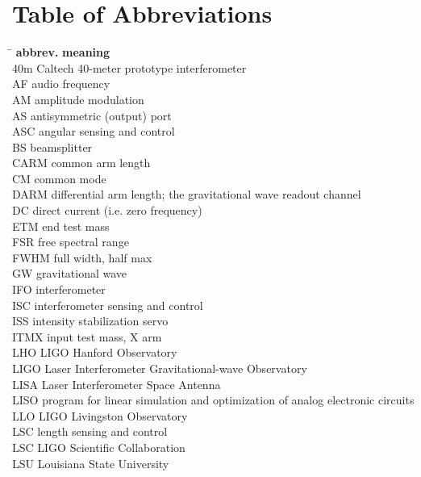 \chapter{Table of Abbreviations}
\label{chapter6}
\singlespacing
\vspace{-20pt}
\begin{tabbing}
\hspace{1in} \= \hspace{5in} \kill
\textbf{abbrev.} \> \textbf{meaning} \\
40m  \> Caltech 40-meter prototype interferometer \\
AF   \> audio frequency \\
AM   \> amplitude modulation \\
AS   \> antisymmetric (output) port \\
ASC  \> angular sensing and control \\
BS   \> beamsplitter \\
CARM \> common arm length \\
CM   \> common mode \\
DARM \> differential arm length; the gravitational wave readout channel \\
DC   \> direct current (i.e. zero frequency) \\
ETM  \> end test mass \\
FSR  \> free spectral range \\
FWHM \> full width, half max \\
GW   \> gravitational wave \\
IFO  \> interferometer \\
ISC  \> interferometer sensing and control \\
ISS  \> intensity stabilization servo \\
ITMX \> input test mass, X arm \\
LHO  \> LIGO Hanford Observatory \\
LIGO \> Laser Interferometer Gravitational-wave Observatory \\
LISA \> Laser Interferometer Space Antenna \\
LISO \> program for linear simulation and optimization of analog electronic circuits \\
LLO  \> LIGO Livingston Observatory \\
LSC  \> length sensing and control \\
LSC  \> LIGO Scientific Collaboration \\
LSU  \> Louisiana State University \\

\end{tabbing}
